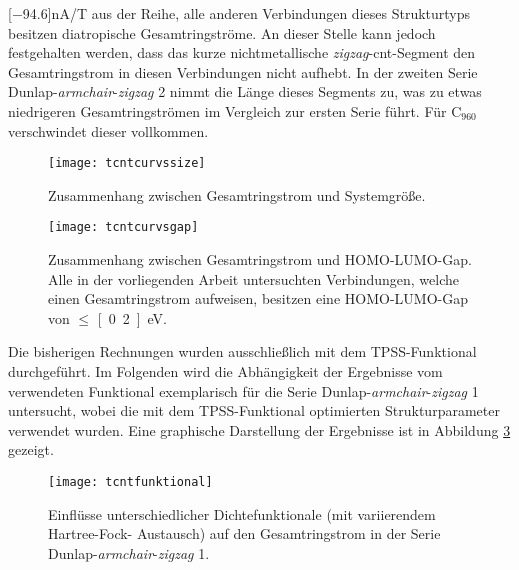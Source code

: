 \unit[$-$94.6]{nA/T} aus der Reihe, alle anderen Verbindungen dieses Strukturtyps besitzen diatropische Gesamtringströme. An dieser Stelle kann jedoch festgehalten werden, dass das kurze nichtmetallische \textit{zigzag}-\ac{cnt}-Segment den Gesamtringstrom in diesen Verbindungen nicht aufhebt. In der zweiten Serie \glqq Dunlap-\textit{armchair}-\textit{zigzag} 2\grqq{} nimmt die Länge dieses Segments zu, was zu etwas niedrigeren Gesamtringströmen im Vergleich zur ersten Serie führt. Für C$_{960}$ verschwindet dieser vollkommen. \\

\begin{figure}[ht!]
	\centering
	\texttt{[image: tcntcurvssize]}
	\captionsetup{figurewithin = chapter}
	\captionsetup{font=small, labelfont=bf}\caption[Zusammenhang zwischen Gesamtringstrom und Systemgröße]{Zusammenhang zwischen Gesamtringstrom und Systemgröße.}
\label{abb:tcntcurvssize}
\end{figure}
\vfill
\FloatBarrier
\newpage

\begin{figure}[ht!]
	\centering
	\texttt{[image: tcntcurvsgap]}
	\captionsetup{figurewithin = chapter}
	\captionsetup{font=small, labelfont=bf}\caption[Zusammenhang zwischen Gesamtringstrom und HOMO-LUMO-Gap]{Zusammenhang zwischen Ge\-samt\-ring\-strom und HOMO-LUMO-Gap. Alle in der vorliegenden Arbeit untersuchten Verbindungen, welche einen Ge\-samt\-ring\-strom aufweisen, besitzen eine HOMO-LUMO-Gap von $\leq$ \unit[0.2]{eV}.}
\label{abb:tcntcurvsgap}
\end{figure}
\FloatBarrier

Die bisherigen Rechnungen wurden ausschließlich mit dem TPSS-Funktional durchgeführt. Im Folgenden wird die Abhängigkeit der Ergebnisse vom verwendeten Funktional exemplarisch für die Serie \glqq Dunlap-\textit{armchair}-\textit{zigzag} 1\grqq{} untersucht, wobei die mit dem TPSS-Funktional optimierten Strukturparameter verwendet wurden. Eine graphische Darstellung der Ergebnisse ist in Abbildung \ref{abb:tcntfunktional} gezeigt. 

\begin{figure}[ht!]
	\centering
	\texttt{[image: tcntfunktional]}
	\captionsetup{figurewithin = chapter}
	\captionsetup{font=small, labelfont=bf}\caption[Funktionaleinflüsse auf Ringströme]{Einflüsse unterschiedlicher Dichtefunktionale (mit variierendem Hartree-Fock-
Austausch) auf den Gesamtringstrom in der Serie \glqq Dunlap-\textit{armchair}-\textit{zigzag} 1\grqq{}.}
\label{abb:tcntfunktional}
\end{figure}
\FloatBarrier

